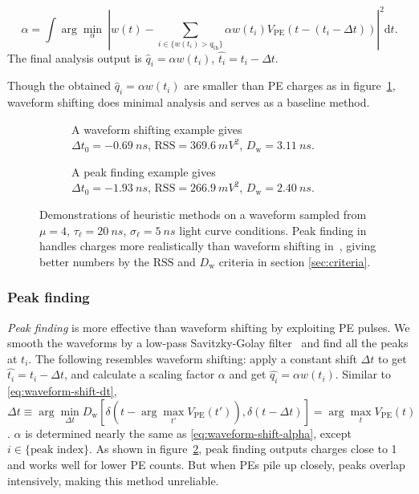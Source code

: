 \begin{equation}
  \alpha = \int \arg\underset{\alpha}{\min}\ \left| w(t) - \sum_{i\in\{w(t_i)>q_\mathrm{th}\}}\alpha w(t_i) V_\mathrm{PE}(t-(t_i-\Delta t)) \right|^2 \mathrm{d}t .
  \label{eq:waveform-shift-alpha}
\end{equation}
The final analysis output is $\hat{q}_i = \alpha w(t_i)$, $\hat{t_i} = t_i - \Delta t$.

Though the obtained $\hat{q}_i = \alpha w(t_i)$  are smaller than PE charges as in figure~\ref{fig:shifting}, waveform shifting does minimal analysis and serves as a baseline method.

\begin{figure}[H]
  \begin{subfigure}{.5\textwidth}
    \centering
    \resizebox{\textwidth}{!}{}
    \caption{\label{fig:shifting} A waveform shifting example gives \\ $\Delta t_0=\SI{-0.69}{ns}$, $\mathrm{RSS}=\SI{369.6}{mV^2}$, $D_\mathrm{w}=\SI{3.11}{ns}$.}
  \end{subfigure}
  \begin{subfigure}{.5\textwidth}
    \centering
    \resizebox{\textwidth}{!}{}
    \caption{\label{fig:peak} A peak finding example gives \\ $\Delta t_0=\SI{-1.93}{ns}$, $\mathrm{RSS}=\SI{266.9}{mV^2}$, $D_\mathrm{w}=\SI{2.40}{ns}$.}
  \end{subfigure}
  \caption{\label{fig:method}Demonstrations of heuristic methods on a waveform sampled from $\mu=4$, $\tau_\ell=\SI{20}{ns}$, $\sigma_\ell=\SI{5}{ns}$ light curve conditions.  Peak finding in~ handles charges more realistically than waveform shifting in~, giving better numbers by the $\mathrm{RSS}$ and $D_\mathrm{w}$ criteria in section \ref{sec:criteria}.}
\end{figure}

\subsubsection{Peak finding}
\label{sec:findpeak}

\textit{Peak finding} is more effective than waveform shifting by exploiting PE pulses.  We smooth the waveforms by a low-pass Savitzky-Golay filter~\cite{savitzky_smoothing_1964} and find all the peaks at $t_i$.  The following resembles waveform shifting: apply a constant shift $\Delta t$ to get $\hat{t_i} = t_i - \Delta t$, and calculate a scaling factor $\alpha$ and get $\hat{q_i}=\alpha w(t_i)$.  Similar to \ref{eq:waveform-shift-dt}, $\displaystyle\Delta t \equiv \arg\underset{\Delta t}{\min} D_\mathrm{w}\left[ \delta(t-\arg\underset{t'}{\max} V_\mathrm{PE}(t')) , \delta(t-\Delta t) \right] = \arg\underset{t}{\max} V_\mathrm{PE}(t)$. $\alpha$ is determined nearly the same as \ref{eq:waveform-shift-alpha}, except $i \in \{\text{peak index}\}$. As shown in figure~\ref{fig:peak}, peak finding outputs charges close to 1 and works well for lower PE counts.  But when PEs pile up closely, peaks overlap intensively, making this method unreliable.

